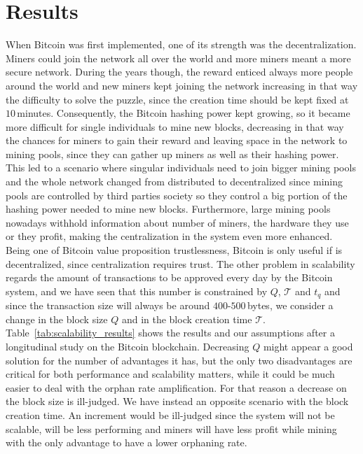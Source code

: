 \documentclass[USenglish]{uit-thesis}
\begin{document}
\section{Results}
\label{sec:results}
When Bitcoin was first implemented, one of its strength was
the decentralization. Miners could join the network all
over the world and more miners meant a more secure
network. During the years though, the reward enticed
always more people around the world and new miners
kept joining the network increasing in that way the
difficulty to solve the puzzle, since the creation time
should be kept fixed at $10$\,minutes. Consequently,
the Bitcoin hashing power kept growing, so
it became more difficult for single individuals to
mine new blocks, decreasing in that way the
chances for miners to gain their reward and leaving
space in the network to mining pools, since
they can gather up miners as well
as their hashing power.
This led to a scenario where singular
individuals need to join bigger mining
pools and the whole network changed
from distributed to decentralized since
mining pools are controlled by third parties
society so they control a big portion
of the hashing power needed to mine new blocks.
Furthermore, large mining pools nowadays
withhold information about number of miners,
the hardware they use or they profit,
making the centralization in the system
even more enhanced. Being one of Bitcoin
value proposition trustlessness, Bitcoin is only useful
if is decentralized, since centralization requires trust.
The other problem in scalability regards the amount
of transactions to be approved every day by the
Bitcoin system, and we have seen that
this number is constrained by
$Q$, $\mathcal{T}$ and $t_q$ and
since the transaction size will always be
around $400$-$500$\,bytes, we consider
a change in the block size $Q$ and
in the block creation time $\mathcal{T}$.
Table~\ref{tab:scalability_results} shows
the results and our assumptions after a
longitudinal study on the Bitcoin
blockchain. Decreasing $Q$ might
appear a good solution for the number
of advantages it has,
but the only two disadvantages are critical
for both performance and
scalability matters, while it could be
much easier to deal
with the orphan rate amplification.
For that reason
a decrease on the block size is ill-judged.
We have instead an opposite scenario
with the block creation time. An increment
would be ill-judged since the system will
not be scalable, will be less performing and
miners will have less profit while mining
with the only advantage to have a lower
orphaning rate.
\end{document}

